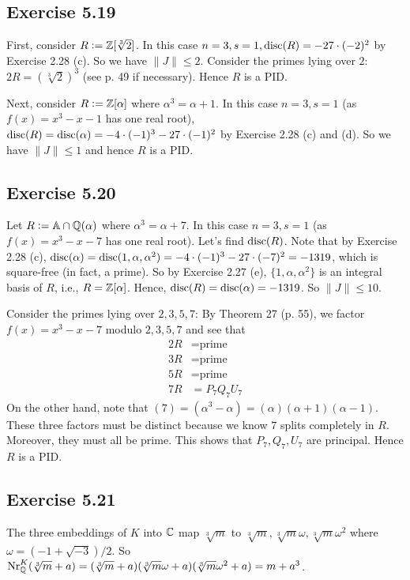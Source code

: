 \documentclass[../Marcus.tex]{subfiles}
\begin{document}
\subsection*{Exercise 5.19}

First, consider $R:=\mathbb{Z}[\sqrt[3]{2}]$. In this case $n=3,s=1,\operatorname{disc}(R) = -27\cdot(-2)^2$ by Exercise 2.28 (c). So we have $\|J\| \leq 2$. Consider the primes lying over $2$: $2R=(\sqrt[3]{2})^3$ (see p. 49 if necessary). Hence $R$ is a PID.

Next, consider $R:=\mathbb{Z}[\alpha]$ where $\alpha^3=\alpha+1$. In this case $n=3,s=1$ (as $f(x)=x^3-x-1$ has one real root), $\operatorname{disc}(R) = \operatorname{disc}(\alpha) = -4\cdot(-1)^3-27\cdot(-1)^2$ by Exercise 2.28 (c) and (d). So we have $\|J\| \leq 1$ and hence $R$ is a PID.

\subsection*{Exercise 5.20}

Let $R:=\mathbb{A}\cap\mathbb{Q}(\alpha)$ where $\alpha^3=\alpha+7$. In this case $n=3,s=1$ (as $f(x)=x^3-x-7$ has one real root). Let's find $\operatorname{disc}(R)$. Note that by Exercise 2.28 (c), $\operatorname{disc}(\alpha) = \operatorname{disc}(1,\alpha,\alpha^2) = -4\cdot(-1)^3-27\cdot(-7)^2 = -1319$, which is square-free (in fact, a prime). So by Exercise 2.27 (e), $\{1,\alpha,\alpha^2\}$ is an integral basis of $R$, i.e., $R=\mathbb{Z}[\alpha]$. Hence, $\operatorname{disc}(R) = \operatorname{disc}(\alpha) = -1319$. So $\|J\| \leq 10$.

Consider the primes lying over $2,3,5,7$: By Theorem 27 (p. 55), we factor $f(x)=x^3-x-7$ modulo $2,3,5,7$ and see that
\begin{align*}
2R &= \text{prime}    \\
3R &= \text{prime}    \\
5R &= \text{prime}    \\
7R &= P_7Q_7U_7
\end{align*}
On the other hand, note that $(7) = (\alpha^3-\alpha) = (\alpha)(\alpha+1)(\alpha-1)$. These three factors must be distinct because we know $7$ splits completely in $R$. Moreover, they must all be prime. This shows that $P_7,Q_7,U_7$ are principal. Hence $R$ is a PID.

\subsection*{Exercise 5.21}

The three embeddings of $K$ into $\mathbb{C}$ map $\sqrt[3]{m}$ to $\sqrt[3]{m},\sqrt[3]{m}\omega,\sqrt[3]{m}\omega^2$ where $\omega=(-1+\sqrt{-3})/2$. So $\operatorname{Nr}^K_{\mathbb{Q}}(\sqrt[3]{m} + a) = (\sqrt[3]{m}+a)(\sqrt[3]{m}\omega+a)(\sqrt[3]{m}\omega^2+a) = m+a^3$.
\end{document}
